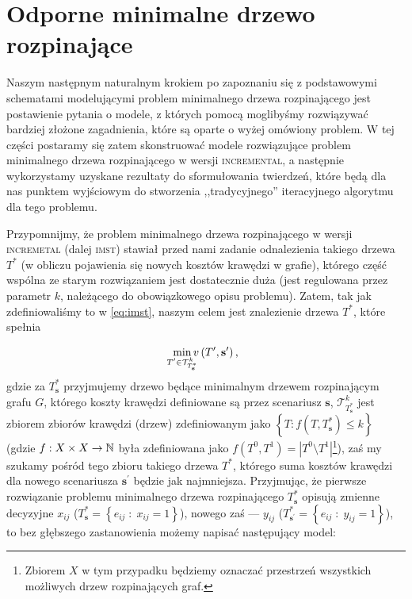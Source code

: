 \section{Odporne minimalne drzewo rozpinające}

Naszym następnym naturalnym krokiem po zapoznaniu się z podstawowymi schematami modelującymi problem minimalnego drzewa rozpinającego jest postawienie pytania o modele, z których pomocą moglibyśmy rozwiązywać bardziej złożone zagadnienia, które są oparte o wyżej omówiony problem. W tej części postaramy się zatem skonstruować modele rozwiązujące problem minimalnego drzewa rozpinającego w wersji \textsc{incremental}, a następnie wykorzystamy uzyskane rezultaty do sformułowania twierdzeń, które będą dla nas punktem wyjściowym do stworzenia ,,tradycyjnego'' iteracyjnego algorytmu dla tego problemu.

Przypomnijmy, że problem minimalnego drzewa rozpinającego w wersji \textsc{incremetal} (dalej \textsc{imst}) stawiał przed nami zadanie odnalezienia takiego drzewa $T^{\ast}$ (w obliczu pojawienia się nowych kosztów krawędzi w grafie), którego część wspólna ze starym rozwiązaniem jest dostatecznie duża (jest regulowana przez parametr $k$, należącego do obowiązkowego opisu problemu). Zatem, tak jak zdefiniowaliśmy to w \ref{eq:imst}, naszym celem jest znalezienie drzewa $T^{\ast}$, które spełnia

\begin{equation}
	\min_{\mathclap{T^{\prime} \in \mathcal{T}^{k}_{T^{\ast}_{\textbf{s}}}}} v \left( T^{\prime}, \textbf{s}^{\prime} \right)\text{,}
\end{equation}
gdzie za $T^{\ast}_{\textbf{s}}$ przyjmujemy drzewo będące minimalnym drzewem rozpinającym grafu $G$, którego koszty krawędzi definiowane są przez scenariusz $\textbf{s}$, $\mathcal{T}^{k}_{T^{\ast}_{\textbf{s}}}$ jest zbiorem zbiorów krawędzi (drzew) zdefiniowanym jako $\left\{ T : f \left( T, T^{\ast}_{\textbf{s}} \right) \leqslant k \right\}$ (gdzie $f: X \times X \rightarrow \mathbb{N}$ była zdefiniowana jako $f \left( T^{0}, T^{1} \right) = \left| T^{0} \setminus T^{1} \right|$\footnote{Zbiorem $X$ w tym przypadku będziemy oznaczać przestrzeń wszystkich możliwych drzew rozpinających graf.}), zaś my szukamy pośród tego zbioru takiego drzewa $T^{\ast}$, którego suma kosztów krawędzi dla nowego scenariusza $\textbf{s}^{\prime}$ będzie jak najmniejsza. Przyjmując, że pierwsze rozwiązanie problemu minimalnego drzewa rozpinającego $T^{\ast}_{\textbf{s}}$ opisują zmienne decyzyjne $x_{ij}$ ($T^{\ast}_{\textbf{s}} = \left\{ e_{ij} \; : \; x_{ij} = 1 \right\}$), nowego zaś --- $y_{ij}$ ($T^{\ast}_{\textbf{s}^{\prime}} = \left\{ e_{ij} \; : \; y_{ij} = 1 \right\}$), to bez głębszego zastanowienia możemy napisać następujący model:

